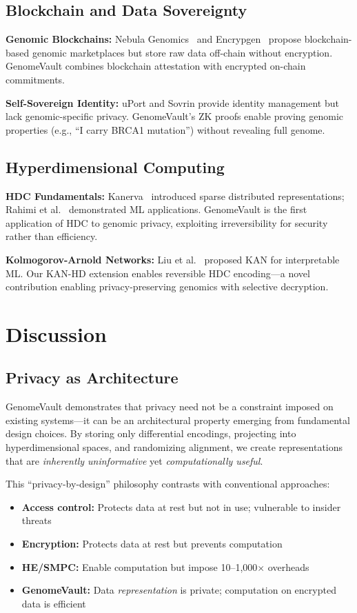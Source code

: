\documentclass[12pt,a4paper]{article}
\begin{document}
\subsection{Blockchain and Data Sovereignty}

\textbf{Genomic Blockchains:} Nebula Genomics~\cite{Grishin2018} and Encrypgen~\cite{Encrypgen2017} propose blockchain-based genomic marketplaces but store raw data off-chain without encryption. GenomeVault combines blockchain attestation with encrypted on-chain commitments.

\textbf{Self-Sovereign Identity:} uPort and Sovrin provide identity management but lack genomic-specific privacy. GenomeVault's ZK proofs enable proving genomic properties (e.g., ``I carry BRCA1 mutation'') without revealing full genome.

\subsection{Hyperdimensional Computing}

\textbf{HDC Fundamentals:} Kanerva~\cite{Kanerva2009} introduced sparse distributed representations; Rahimi et al.~\cite{Rahimi2016} demonstrated ML applications. GenomeVault is the first application of HDC to genomic privacy, exploiting irreversibility for security rather than efficiency.

\textbf{Kolmogorov-Arnold Networks:} Liu et al.~\cite{Liu2024} proposed KAN for interpretable ML. Our KAN-HD extension enables reversible HDC encoding---a novel contribution enabling privacy-preserving genomics with selective decryption.

\section{Discussion}

\subsection{Privacy as Architecture}

GenomeVault demonstrates that privacy need not be a constraint imposed on existing systems---it can be an architectural property emerging from fundamental design choices. By storing only differential encodings, projecting into hyperdimensional spaces, and randomizing alignment, we create representations that are \textit{inherently uninformative} yet \textit{computationally useful}.

This ``privacy-by-design'' philosophy contrasts with conventional approaches:
\begin{itemize}
\item \textbf{Access control:} Protects data at rest but not in use; vulnerable to insider threats
\item \textbf{Encryption:} Protects data at rest but prevents computation
\item \textbf{HE/SMPC:} Enable computation but impose 10--1,000$\times$ overheads
\item \textbf{GenomeVault:} Data \textit{representation} is private; computation on encrypted data is efficient
\end{itemize}
\end{document}
